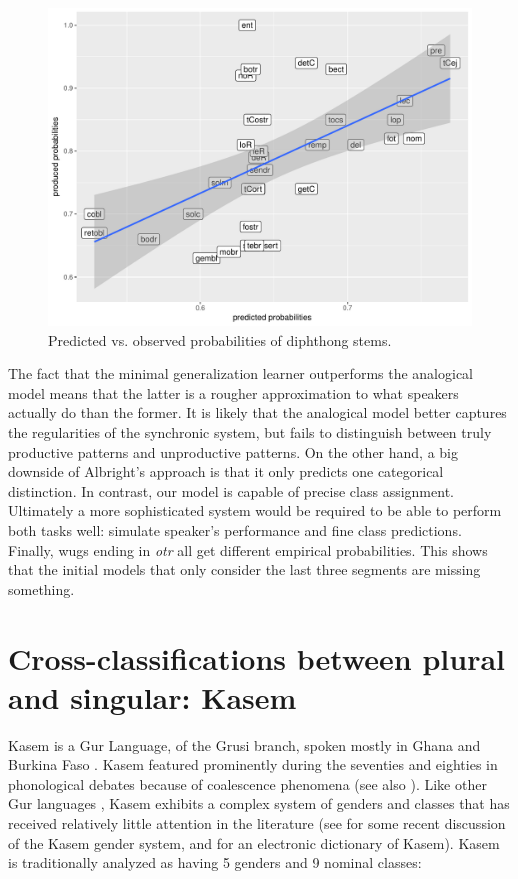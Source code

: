 \begin{figure}
  \centering
  \includegraphics[scale=0.6]{./figures/spanish/corr-plot.pdf}
  \caption{Predicted vs. observed probabilities of diphthong stems.}\label{fig:corr-plot}
\end{figure}

The fact that the minimal generalization learner outperforms the analogical model means that the latter is a rougher approximation to what speakers actually do than the former. It is likely that the analogical model better captures the regularities of the synchronic system, but fails to distinguish between truly productive patterns and unproductive patterns. On the other hand, a big downside of Albright's approach is that it only predicts one categorical distinction. In contrast, our model is capable of precise class assignment. Ultimately a more sophisticated system would be required to be able to perform both tasks well: simulate speaker's performance and fine class predictions. Finally, wugs ending in \textit{otr} all get different empirical probabilities. This shows that the initial models that only consider the last three segments are missing something.


\section{Cross-classifications between plural and singular: Kasem}


Kasem is a Gur Language, of the Grusi branch, spoken mostly in Ghana and Burkina Faso \autocite{Naden.1988}. Kasem featured prominently during the seventies and eighties in phonological debates \autocites{Phelps.1975, Phelps.1979, Halle.1978, deHaas.1987, deHaas.1988} because of coalescence phenomena (see also \citealt{Zaleska.forth.}). Like other Gur languages \autocite{Naden.1989}, Kasem exhibits a complex system of genders and classes that has received relatively little attention in the literature (see \textcite{Awedoba.2003} for some recent discussion of the Kasem gender system, and \textcite{Niggli.2016} for an electronic dictionary of Kasem). Kasem is traditionally analyzed as having 5 genders and 9 nominal classes:

